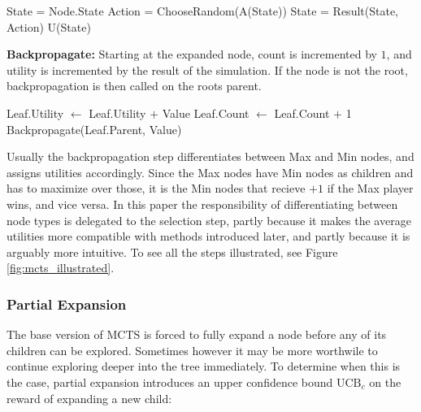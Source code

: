 \begin{algorithm}
    \begin{algorithmic}[1]
            \State State = Node.State
                \State Action = ChooseRandom(A(State))
                \State State = Result(State, Action)
            \EndWhile
            \State \Return U(State)
        \EndProcedure
    \end{algorithmic}    
\end{algorithm}

\textbf{Backpropagate:} Starting at the expanded node, count is 
incremented by $1$, and utility is incremented by the result of
the simulation. If the node is not the root, backpropagation
is then called on the roots parent.

\begin{algorithm}
    \begin{algorithmic}[1]
            \State Leaf.Utility $\leftarrow$ Leaf.Utility $+$ Value
            \State Leaf.Count $\leftarrow$ Leaf.Count $+$ 1
                \State Backpropagate(Leaf.Parent, Value)
            \EndIf
        \EndProcedure
    \end{algorithmic}    
\end{algorithm}

Usually the backpropagation step differentiates between Max and Min nodes, and assigns utilities accordingly. Since the Max nodes have Min nodes as children and has to maximize over those, it is the Min nodes that recieve $+1$ if the Max player wins, and vice versa. In this paper the responsibility of differentiating between node types is delegated to the selection step, partly because it makes the average utilities more compatible with methods introduced later, and partly because it is arguably more intuitive. To see all the steps illustrated, see Figure \ref{fig:mcts_illustrated}.



\subsubsection{Partial Expansion}
The base version of MCTS is forced to fully expand a node
before any of its children can be explored. Sometimes however
it may be more worthwile to continue exploring deeper into the
tree immediately. To determine when this is the case, partial
expansion \cite{Jacobsen2014, Frydenberg2015} introduces an upper confidence bound $\text{UCB}_c$ on 
the reward of expanding a new child:

